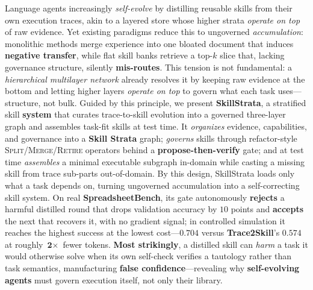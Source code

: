 Language agents increasingly \emph{self-evolve} by distilling reusable skills from their own execution traces, akin to a layered store whose higher strata \emph{operate on top} of raw evidence.
Yet existing paradigms reduce this to ungoverned \emph{accumulation}: monolithic methods merge experience into one bloated document that induces \textbf{negative transfer}, while flat skill banks retrieve a top-$k$ slice that, lacking governance structure, silently \textbf{mis-routes}.
This tension is not fundamental: a \emph{hierarchical multilayer network} already resolves it by keeping raw evidence at the bottom and letting higher layers \emph{operate on top} to govern what each task uses---structure, not bulk.
Guided by this principle, we present \textbf{SkillStrata}, a stratified skill \textbf{system} that curates trace-to-skill evolution into a governed three-layer graph and assembles task-fit skills at test time.
It \emph{organizes} evidence, capabilities, and governance into a \textbf{Skill Strata} graph; \emph{governs} skills through refactor-style \textsc{Split}/\textsc{Merge}/\textsc{Retire} operators behind a \textbf{propose-then-verify} gate; and at test time \emph{assembles} a minimal executable subgraph in-domain while casting a missing skill from trace sub-parts out-of-domain.
By this design, SkillStrata loads only what a task depends on, turning ungoverned accumulation into a self-correcting skill system.
On real \textbf{SpreadsheetBench}, its gate autonomously \textbf{rejects} a harmful distilled round that drops validation accuracy by $10$ points and \textbf{accepts} the next that recovers it, with no gradient signal; in controlled simulation it reaches the highest success at the lowest cost---$0.704$ versus \textbf{Trace2Skill}'s $0.574$ at roughly $\textbf{2}\times$ fewer tokens.
\textbf{Most strikingly}, a distilled skill can \emph{harm} a task it would otherwise solve when its own self-check verifies a tautology rather than task semantics, manufacturing \textbf{false confidence}---revealing why \textbf{self-evolving agents} must govern execution itself, not only their library.
